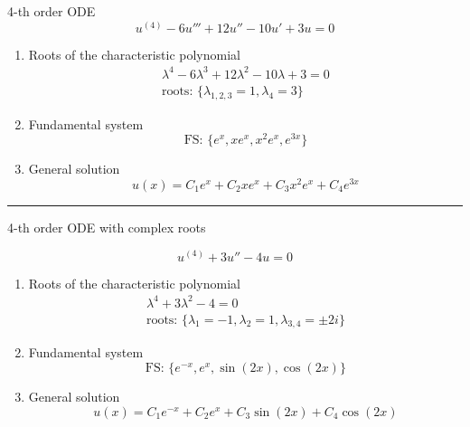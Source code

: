 \begin{examplesection}
    4-th order ODE
    \begin{equation*}
        u^{(4)} - 6u''' + 12u'' -10u' + 3u = 0 %
    \end{equation*}
    \begin{enumerate}
        \item Roots of the characteristic polynomial
              \begin{gather*}
                  \lambda^4 - 6\lambda^3 + 12\lambda^2 - 10\lambda + 3 = 0\\
                  \text{roots: }\{ \lambda_{1,2,3} = 1, \lambda_4 = 3\}
              \end{gather*}
        \item Fundamental system
              \begin{equation*}
                  \text{FS: } \{e^x, xe^x, x^2e^x, e^{3x}\}
              \end{equation*}
        \item General solution
              \begin{equation*}
                  u(x) = C_1e^x + C_2xe^x + C_3x^2e^x + C_4e^{3x}
              \end{equation*}
    \end{enumerate}
    
    \hrule
    
    4-th order ODE with complex roots
    
    \begin{equation*}
        u^{(4)} + 3u'' - 4u = 0
    \end{equation*}
    \begin{enumerate}
        \item Roots of the characteristic polynomial
              \begin{gather*}
                  \lambda^4 + 3\lambda^2 - 4 = 0\\
                  \text{roots: }\{ \lambda_1 = -1, \lambda_2 = 1, \lambda_{3,4} = \pm 2i\}
              \end{gather*}
        \item Fundamental system
              \begin{equation*}
                  \text{FS: } \{e^{-x}, e^x, \sin(2x), \cos(2x)\}
              \end{equation*}
        \item General solution
              \begin{equation*}
                  u(x) = C_1e^{-x} + C_2e^x + C_3\sin(2x) + C_4\cos(2x)
              \end{equation*}
    \end{enumerate}
\end{examplesection}


